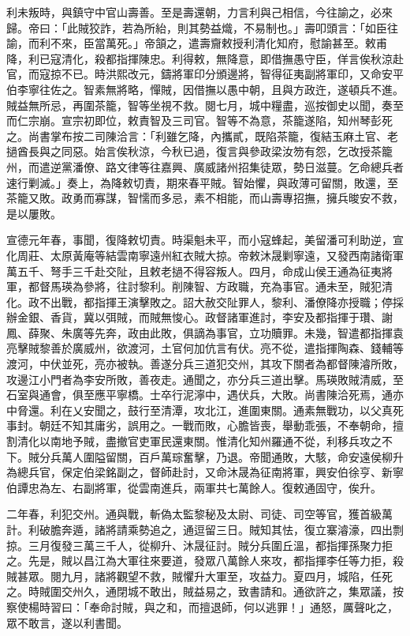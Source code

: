 \begin{pinyinscope}
利未叛時，與鎮守中官山壽善。至是壽還朝，力言利與己相信，今往諭之，必來歸。帝曰：「此賊狡詐，若為所紿，則其勢益熾，不易制也。」壽叩頭言：「如臣往諭，而利不來，臣當萬死。」帝頷之，遣壽齎敕授利清化知府，慰諭甚至。敕甫降，利已寇清化，殺都指揮陳忠。利得敕，無降意，即借撫愚守臣，佯言俟秋涼赴官，而寇掠不已。時洪熙改元，鑄將軍印分頒邊將，智得征夷副將軍印，又命安平伯李寧往佐之。智素無將略，憚賊，因借撫以愚中朝，且與方政迕，遂頓兵不進。賊益無所忌，再圍茶籠，智等坐視不救。閱七月，城中糧盡，巡按御史以聞，奏至而仁宗崩。宣宗初即位，敕責智及三司官。智等不為意，茶籠遂陷，知州琴彭死之。尚書掌布按二司陳洽言：「利雖乞降，內攜貳，既陷茶籠，復結玉麻土官、老撾酋長與之同惡。始言俟秋涼，今秋已過，復言與參政梁汝笏有怨，乞改授茶籠州，而遣逆黨潘僚、路文律等往嘉興、廣威諸州招集徒眾，勢日滋蔓。乞命總兵者速行剿滅。」奏上，為降敕切責，期來春平賊。智始懼，與政薄可留關，敗還，至茶籠又敗。政勇而寡謀，智懦而多忌，素不相能，而山壽專招撫，擁兵晙安不救，是以屢敗。

宣德元年春，事聞，復降敕切責。時渠魁未平，而小寇蜂起，美留潘可利助逆，宣化周莊、太原黃庵等結雲南寧遠州紅衣賊大掠。帝敕沐晟剿寧遠，又發西南諸衛軍萬五千、弩手三千赴交阯，且敕老撾不得容叛人。四月，命成山侯王通為征夷將軍，都督馬瑛為參將，往討黎利。削陳智、方政職，充為事官。通未至，賊犯清化。政不出戰，都指揮王演擊敗之。詔大赦交阯罪人，黎利、潘僚降亦授職；停採辦金銀、香貨，冀以弭賊，而賊無悛心。政督諸軍進討，李安及都指揮于瓚、謝鳳、薛聚、朱廣等先奔，政由此敗，俱謫為事官，立功贖罪。未幾，智遣都指揮袁亮擊賊黎善於廣威州，欲渡河，土官何加伉言有伏。亮不從，遣指揮陶森、錢輔等渡河，中伏並死，亮亦被執。善遂分兵三道犯交州，其攻下關者為都督陳濬所敗，攻邊江小門者為李安所敗，善夜走。通聞之，亦分兵三道出擊。馬瑛敗賊清威，至石室與通會，俱至應平寧橋。士卒行泥濘中，遇伏兵，大敗。尚書陳洽死焉，通亦中脅還。利在乂安聞之，鼓行至清潭，攻北江，進圍東關。通素無戰功，以父真死事封。朝廷不知其庸劣，誤用之。一戰而敗，心膽皆喪，舉動乖張，不奉朝命，擅割清化以南地予賊，盡撤官吏軍民還東關。惟清化知州羅通不從，利移兵攻之不下。賊分兵萬人圍隘留關，百戶萬琮奮擊，乃退。帝聞通敗，大駭，命安遠侯柳升為總兵官，保定伯梁銘副之，督師赴討，又命沐晟為征南將軍，興安伯徐亨、新寧伯譚忠為左、右副將軍，從雲南進兵，兩軍共七萬餘人。復敕通固守，俟升。

二年春，利犯交州。通與戰，斬偽太監黎秘及太尉、司徒、司空等官，獲首級萬計。利破膽奔遁，諸將請乘勢追之，通逗留三日。賊知其怯，復立寨濬濠，四出剽掠。三月復發三萬三千人，從柳升、沐晟征討。賊分兵圍丘溫，都指揮孫聚力拒之。先是，賊以昌江為大軍往來要道，發眾八萬餘人來攻，都指揮李任等力拒，殺賊甚眾。閱九月，諸將觀望不救，賊懼升大軍至，攻益力。夏四月，城陷，任死之。時賊圍交州久，通閉城不敢出，賊益易之，致書請和。通欲許之，集眾議，按察使楊時習曰：「奉命討賊，與之和，而擅退師，何以逃罪！」通怒，厲聲叱之，眾不敢言，遂以利書聞。


\end{pinyinscope}

